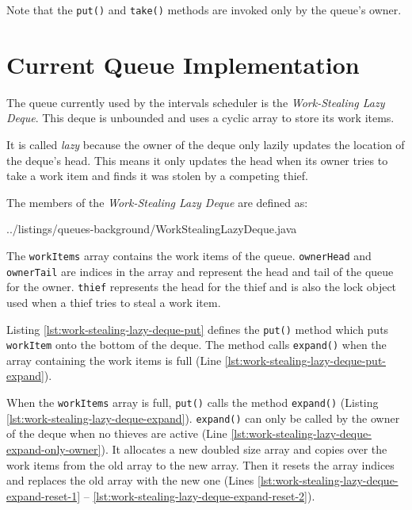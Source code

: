 

Note that the \lstinline!put()! and \lstinline!take()! methods are
invoked only by the queue's owner.


\section{Current Queue Implementation}
\label{sec:queues-background-current-implementation}

The queue currently used by the intervals scheduler is the
\emph{Work-Stealing Lazy Deque}. This deque is unbounded and uses a
cyclic array to store its work items.

It is called \emph{lazy} because the owner of the deque only lazily
updates the location of the deque's head. This means it only updates
the head when its owner tries to take a work item and finds it was
stolen by a competing thief.

The members of the \emph{Work-Stealing Lazy Deque} are defined as:


{
    ../listings/queues-background/WorkStealingLazyDeque.java
}

The \lstinline!workItems! array contains the work items of the
queue. \lstinline!ownerHead! and \lstinline!ownerTail! are indices in
the array and represent the head and tail of the queue for the
owner. \lstinline!thief! represents the head for the thief and is also
the lock object used when a thief tries to steal a work item.

Listing \ref{lst:work-stealing-lazy-deque-put} defines the
\lstinline!put()! method which puts \lstinline!workItem! onto the
bottom of the deque. The method calls \lstinline!expand()! when the
array containing the work items is full (Line
\ref{lst:work-stealing-lazy-deque-put-expand}).



When the \lstinline!workItems! array is full, \lstinline!put()! calls
the method \lstinline!expand()! (Listing
\ref{lst:work-stealing-lazy-deque-expand}). \lstinline!expand()! can
only be called by the owner of the deque when no thieves are active
(Line \ref{lst:work-stealing-lazy-deque-expand-only-owner}). It
allocates a new doubled size array and copies over the work items from
the old array to the new array. Then it resets the array indices and
replaces the old array with the new one (Lines
\ref{lst:work-stealing-lazy-deque-expand-reset-1} --
\ref{lst:work-stealing-lazy-deque-expand-reset-2}).

